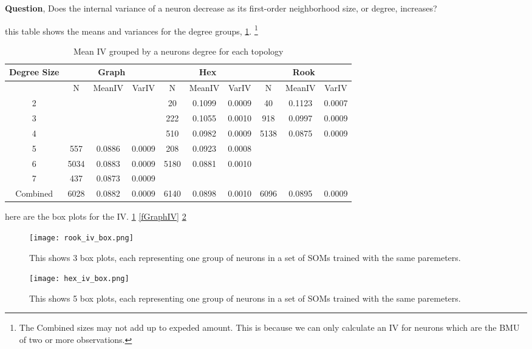 \textbf{Question}, Does the internal variance of a neuron decrease as its first-order
neighborhood size, or degree, increases?



this table shows the means and variances for the degree groups,
\ref{meanvar1}. \footnote{The Combined sizes may not add up to expeded amount.
This is because we can only calculate an IV for neurons which are the BMU of
two or more observations.}

\begin{table}
\caption{Mean IV grouped by a neurons degree for each topology}
\label{meanvar1}
\begin{tabular}{|c||c|c|c||c|c|c||c|c|c|}
\hline
\textbf{Degree Size} & \multicolumn{3}{c||}{\textbf{Graph}} &
\multicolumn{3}{c||}{\textbf{Hex}} & \multicolumn{3}{c|}{\textbf{Rook}} \\
\hline
& N & MeanIV & VarIV & N & MeanIV & VarIV & N & MeanIV & VarIV \\
\hline
2&&&& 20& 0.1099& 0.0009& 40& 0.1123& 0.0007\\ 
3&&&& 222& 0.1055& 0.0010& 918& 0.0997& 0.0009\\ 
4&&&& 510& 0.0982& 0.0009& 5138& 0.0875& 0.0009\\ 
5& 557& 0.0886& 0.0009& 208& 0.0923& 0.0008&&&\\ 
6& 5034& 0.0883& 0.0009& 5180& 0.0881& 0.0010&&&\\ 
7& 437& 0.0873& 0.0009&&&&&&\\ 
\hline 
Combined& 6028& 0.0882& 0.0009& 6140& 0.0898& 0.0010& 6096& 0.0895& 0.0009\\ 
\hline
\end{tabular} \end{table}




here are the box plots for the IV. \ref{fRookIV} \ref{fGraphIV} \ref{fHexIV}


\begin{figure}
\centering
\texttt{[image: rook\_iv\_box.png]}
\caption{This shows 3 box plots, each representing one group of neurons in a set
of SOMs trained with the same paremeters.}
\label{fRookIV}
\end{figure}

\begin{figure}
\centering
\texttt{[image: hex\_iv\_box.png]}
\caption{This shows 5 box plots, each representing one group of neurons in a set
of SOMs trained with the same paremeters.}
\label{fHexIV}
\end{figure}

